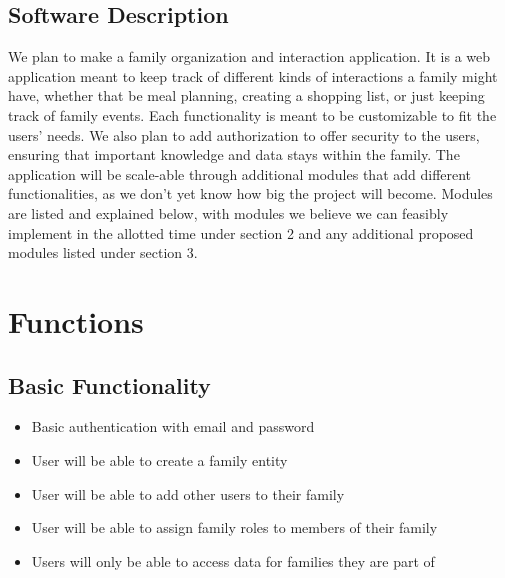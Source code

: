\documentclass[12pt]{article}
\begin{document}
\subsection{Software Description}
We plan to make a family organization and interaction application. It is a web application meant to keep track of different 
kinds of interactions a family might have, whether that be meal planning, creating a shopping list, or just keeping track of 
family events. Each functionality is meant to be customizable to fit the users' needs. We also plan to add authorization to offer 
security to the users, ensuring that important knowledge and data stays within the family. The application will be scale-able through 
additional modules that add different functionalities, as we don't yet know how big the project will become. Modules are listed and 
explained below, with modules we believe we can feasibly implement in the allotted time under section 2 and any 
additional proposed modules listed under section 3.

\section{Functions}
\subsection{Basic Functionality}
\begin{itemize}
    \item Basic authentication with email and password
    \item User will be able to create a family entity
    \item User will be able to add other users to their family
    \item User will be able to assign family roles to members of their family
    \item Users will only be able to access data for families they are part of
\end{itemize}
\end{document}
